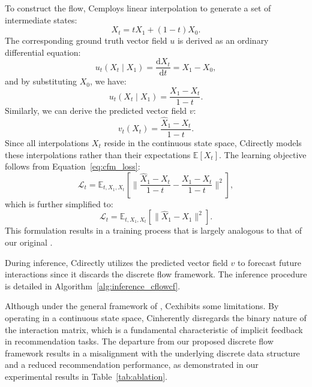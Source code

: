\documentclass[sigconf]{acmart}
\begin{document}
To construct the flow, C\ours employs linear interpolation to generate a set of intermediate states:
\begin{equation*}
X_t = t X_1 + (1 - t) X_0.
\end{equation*}
The corresponding ground truth vector field $u$ is derived as an ordinary differential equation:
\begin{equation*}
u_t(X_t \mid X_1) = \frac{\mathrm d X_t}{\mathrm d t} = X_1 - X_0,
\end{equation*}
and by substituting $X_0$, we have:
\begin{equation*}
u_t(X_t \mid X_1) = \frac{X_1 - X_t}{1 - t}.
\end{equation*}
Similarly, we can derive the predicted vector field $v$:
\begin{equation*}
v_t(X_t) = \frac{\hat X_1 - X_t}{1 - t}.
\end{equation*}
Since all interpolations $X_t$ reside in the continuous state space, C\ours directly models these interpolations rather than their expectations $\mathbb E[X_t]$. The learning objective follows from Equation~\ref{eq:cfm_loss}:
\begin{equation*}
\mathcal L_t = \mathbb{E}_{t, X_1, X_t} \left[\|\frac{\hat X_1 - X_t}{1 - t} - \frac{X_1 - X_t}{1 - t}\|^2 \right],
\end{equation*}
which is further simplified to:
\begin{equation*}
\mathcal{L}_t = \mathbb{E}_{t, X_1, X_t} \left[\|\hat X_1 - X_1\|^2 \right].
\end{equation*}
This formulation results in a training process that is largely analogous to that of our original \ours.

During inference, C\ours directly utilizes the predicted vector field $v$ to forecast future interactions since it discards the discrete flow framework. The inference procedure is detailed in Algorithm~\ref{alg:inference_cflowcf}.

Although under the general framework of \ours, C\ours exhibits some limitations. By operating in a continuous state space, C\ours inherently disregards the binary nature of the interaction matrix, which is a fundamental characteristic of implicit feedback in recommendation tasks. The departure from our proposed discrete flow framework results in a misalignment with the underlying discrete data structure and a reduced recommendation performance, as demonstrated in our experimental results in Table~\ref{tab:ablation}.
\end{document}

